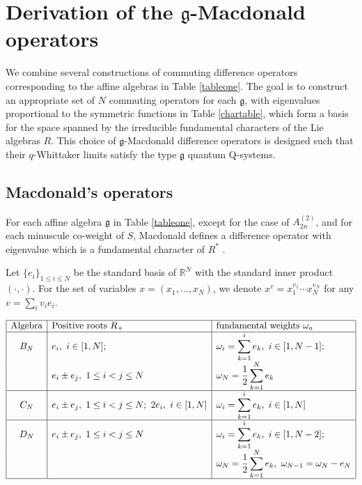 \documentclass[12pt]{amsart}
\newcommand{\g}{{\mathfrak{g}}}
\newcommand{\R}{{\mathbb R}}
\numberwithin{equation}{section}
\begin{document}
\appendix



\section{Derivation of the $\g$-Macdonald operators}\label{appendixA}
\label{appA}

We combine several constructions \cite{macdoroot,vandiej,Rains} of commuting difference operators corresponding to the affine algebras in Table \ref{tableone}. The goal is to construct an appropriate set of $N$ commuting operators for each $\g$, with  eigenvalues proportional to the symmetric functions in Table \ref{chartable}, which form a basis for the space spanned by the irreducible fundamental characters of the Lie algebras $R$.
This choice of $\g$-Macdonald difference operators is designed such that their $q$-Whittaker limits satisfy the type $\g$ quantum Q-systems.

%

\subsection{Macdonald's operators}
\label{appmacsec}

%
%
%
%
%
%

For each affine algebra $\g$ in Table \ref{tableone}, except for the case of $A_{2n}^{(2)}$, and for each minuscule co-weight of $S$, Macdonald defines a  difference operator with eigenvalue which is a fundamental character of $R^*$ \cite{macdoroot}.

%
%
%

%
%
%
%
%
%

Let $\{e_i\}_{1\leq i\leq N}$ be the standard basis of $\R^N$ with the standard inner product $(\cdot,\cdot)$.  For the set of variables $x=(x_1,...,x_N)$, we denote $x^v=x_1^{v_1}\cdots x_N^{v_N}$ for any $v=\sum_i v_i e_i$.
\begin{table}


\renewcommand{\arraystretch}{1}
\begin{equation*}
\begin{array}{|c|l|l|}
\hline
\hbox{Algebra} & \hbox{Positive roots $R_+$} & \hbox{fundamental weights $\omega_a$}\\ \hline
B_N & e_i,\ i\in[1,N]; & 
\displaystyle{\omega_i=\sum_{k=1}^i e_k,\ i\in[1,N-1]};\\
& e_i\pm e_j,\ 1\leq i< j\leq N&\displaystyle{  \omega_N=\frac{1}{2}\sum_{k=1}^N e_k}\\ \hline
C_N &e_i\pm e_j,\ 1\leq i< j\leq N; \ 2e_i, \ i\in[1,N] &\displaystyle{\omega_i=\sum_{k=1}^i e_k,\ i\in[1,N] }\\ \hline
D_N & e_i\pm e_j, \ 1\leq i<j\leq N& \displaystyle{
\omega_i=\sum_{k=1}^i e_k,\  i\in[1,N-2]; }\\
&& \displaystyle{\omega_N=\frac{1}{2}\sum_{k=1}^N e_k,\ \omega_{N-1}=\omega_N-e_N}\\ \hline
\end{array}
\end{equation*}
\caption{Positive roots and fundamental weights of the finite dimensional algebras of types BCD.}\label{rootsandweights}
\end{table}
%
%
%
\end{document}
